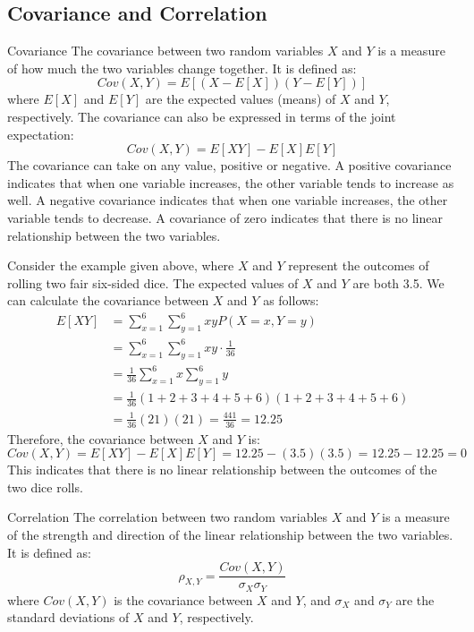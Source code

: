 \documentclass[openany]{book}
\begin{document}
\subsection{Covariance and Correlation}
\begin{mydefinition}{Covariance}
    The covariance between two random variables $X$ and $Y$ is a measure of how much the two variables change together. It is defined as:
    $$Cov(X, Y) = E[(X - E[X])(Y - E[Y])]$$
    where $E[X]$ and $E[Y]$ are the expected values (means) of $X$ and $Y$, respectively. The covariance can also be expressed in terms of the joint expectation:
    $$Cov(X, Y) = E[XY] - E[X]E[Y]$$
    The covariance can take on any value, positive or negative. A positive covariance indicates that when one variable increases, the other variable tends to increase as well. A negative covariance indicates that when one variable increases, the other variable tends to decrease. A covariance of zero indicates that there is no linear relationship between the two variables.
\end{mydefinition}
\begin{example}
    Consider the example given above, where $X$ and $Y$ represent the outcomes of rolling two fair six-sided dice. The expected values of $X$ and $Y$ are both 3.5. We can calculate the covariance between $X$ and $Y$ as follows:
    \begin{align*}
        E[XY] &= \sum_{x=1}^{6} \sum_{y=1}^{6} xy P(X = x, Y = y) \\
        &= \sum_{x=1}^{6} \sum_{y=1}^{6} xy \cdot \frac{1}{36} \\
        &= \frac{1}{36} \sum_{x=1}^{6} x \sum_{y=1}^{6} y \\
        &= \frac{1}{36} (1 + 2 + 3 + 4 + 5 + 6)(1 + 2 + 3 + 4 + 5 + 6) \\
        &= \frac{1}{36} (21)(21) = \frac{441}{36} = 12.25
    \end{align*}
    Therefore, the covariance between $X$ and $Y$ is:
    $$Cov(X, Y) = E[XY] - E[X]E[Y] = 12.25 - (3.5)(3.5) = 12.25 - 12.25 = 0$$
    This indicates that there is no linear relationship between the outcomes of the two dice rolls.
\end{example}
\begin{mydefinition}{Correlation}
    The correlation between two random variables $X$ and $Y$ is a measure of the strength and direction of the linear relationship between the two variables. It is defined as:
    $$\rho_{X,Y} = \frac{Cov(X, Y)}{\sigma_X \sigma_Y}$$
    where $Cov(X, Y)$ is the covariance between $X$ and $Y$, and $\sigma_X$ and $\sigma_Y$ are the standard deviations of $X$ and $Y$, respectively. 
\end{mydefinition}
\end{document}
